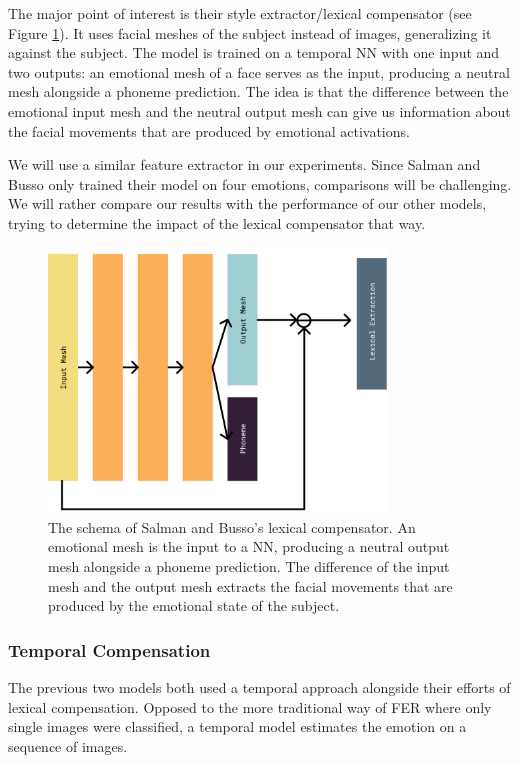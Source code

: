 The major point of interest is their style extractor/lexical compensator (see Figure \ref{fig:bussose}). It uses facial meshes of the subject instead of images, generalizing it against the subject. The model is trained on a temporal NN with one input and two outputs: an emotional mesh of a face serves as the input, producing a neutral mesh alongside a phoneme prediction. The idea is that the difference between the emotional input mesh and the neutral output mesh can give us information about the facial movements that are produced by emotional activations.

We will use a similar feature extractor in our experiments. Since Salman and Busso only trained their model on four emotions, comparisons will be challenging. We will rather compare our results with the performance of our other models, trying to determine the impact of the lexical compensator that way. 

\begin{figure}
    \centering
    \includegraphics[width=0.8\textwidth]{res/BussoSE.pdf}
    \caption{The schema of Salman and Busso's lexical compensator. An emotional mesh is the input to a NN, producing a neutral output mesh alongside a phoneme prediction. The difference of the input mesh and the output mesh extracts the facial movements that are produced by the emotional state of the subject.}
    \label{fig:bussose}
\end{figure}

\subsubsection{Temporal Compensation}
The previous two models both used a temporal approach alongside their efforts of lexical compensation. Opposed to the more traditional way of FER where only single images were classified, a temporal model estimates the emotion on a sequence of images. 


